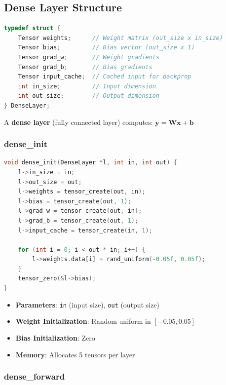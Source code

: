 \documentclass[11pt,a4paper]{article}
\begin{document}
\subsection{Dense Layer Structure}

\begin{lstlisting}[language=C, caption={Dense layer data structure}]
typedef struct {
    Tensor weights;      // Weight matrix (out_size x in_size)
    Tensor bias;         // Bias vector (out_size x 1)
    Tensor grad_w;       // Weight gradients
    Tensor grad_b;       // Bias gradients
    Tensor input_cache;  // Cached input for backprop
    int in_size;         // Input dimension
    int out_size;        // Output dimension
} DenseLayer;
\end{lstlisting}

A \textbf{dense layer} (fully connected layer) computes: $\mathbf{y} = \mathbf{W}\mathbf{x} + \mathbf{b}$

\subsubsection{dense\_init}

\begin{lstlisting}[language=C, caption={Dense layer initialization}]
void dense_init(DenseLayer *l, int in, int out) {
    l->in_size = in;
    l->out_size = out;
    l->weights = tensor_create(out, in);
    l->bias = tensor_create(out, 1);
    l->grad_w = tensor_create(out, in);
    l->grad_b = tensor_create(out, 1);
    l->input_cache = tensor_create(in, 1);

    for (int i = 0; i < out * in; i++) {
        l->weights.data[i] = rand_uniform(-0.05f, 0.05f);
    }
    tensor_zero(&l->bias);
}
\end{lstlisting}

\begin{itemize}
    \item \textbf{Parameters}: \texttt{in} (input size), \texttt{out} (output size)
    \item \textbf{Weight Initialization}: Random uniform in $[-0.05, 0.05]$
    \item \textbf{Bias Initialization}: Zero
    \item \textbf{Memory}: Allocates 5 tensors per layer
\end{itemize}

\subsubsection{dense\_forward}
\end{document}
